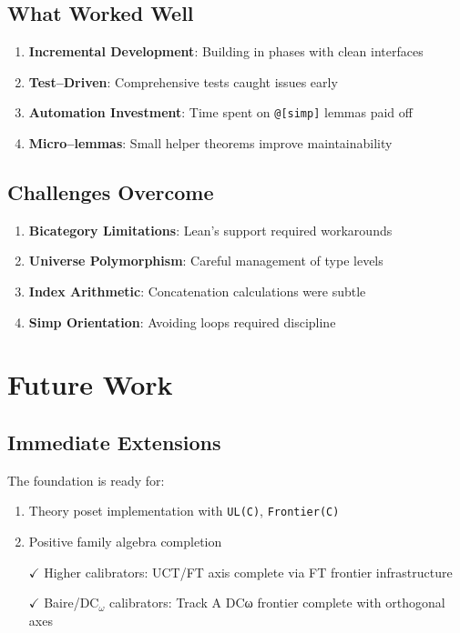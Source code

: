 \documentclass[11pt]{article}
\theoremstyle{definition}
\theoremstyle{remark}
\newcommand{\lean}[1]{\texttt{#1}}
\begin{document}
\subsection{What Worked Well}

\begin{enumerate}
\item \textbf{Incremental Development}: Building in phases with clean interfaces
\item \textbf{Test--Driven}: Comprehensive tests caught issues early
\item \textbf{Automation Investment}: Time spent on \texttt{@[simp]} lemmas paid off
\item \textbf{Micro--lemmas}: Small helper theorems improve maintainability
\end{enumerate}

\subsection{Challenges Overcome}

\begin{enumerate}
\item \textbf{Bicategory Limitations}: Lean's support required workarounds
\item \textbf{Universe Polymorphism}: Careful management of type levels
\item \textbf{Index Arithmetic}: Concatenation calculations were subtle
\item \textbf{Simp Orientation}: Avoiding loops required discipline
\end{enumerate}

\section{Future Work}

\subsection{Immediate Extensions}

The foundation is ready for:
\begin{enumerate}
\item Theory poset implementation with \lean{UL(C)}, \lean{Frontier(C)}
\item Positive family algebra completion
\item[$\checkmark$] Higher calibrators: UCT/FT axis complete via FT frontier infrastructure
\item[$\checkmark$] Baire/DC$_\omega$ calibrators: Track A DCω frontier complete with orthogonal axes
\end{enumerate}
\end{document}
